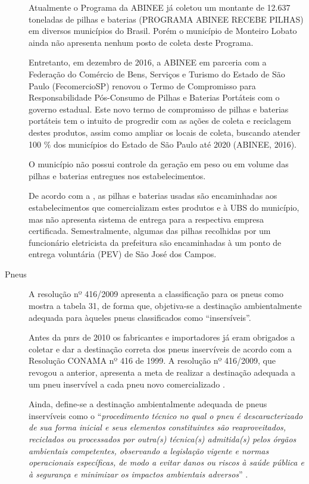 \begin{description}
		Atualmente o Programa da ABINEE já coletou um montante de 12.637 toneladas de pilhas e baterias (PROGRAMA ABINEE RECEBE PILHAS) em diversos municípios do Brasil. Porém o município de Monteiro Lobato ainda não apresenta nenhum posto de coleta deste Programa.
		
		Entretanto, em dezembro de 2016, a ABINEE em parceria com a Federação do Comércio de Bens, Serviços e Turismo do Estado de São Paulo (FecomercioSP) renovou o Termo de Compromisso para Responsabilidade Pós-Consumo de Pilhas e Baterias Portáteis com o governo estadual. Este novo termo de compromisso de pilhas e baterias portáteis tem o intuito de progredir com as ações de coleta e reciclagem destes produtos, assim como ampliar os locais de coleta, buscando atender 100 \% dos municípios do Estado de São Paulo até 2020 (ABINEE, 2016).
		
			O município não possui controle da geração em peso ou em volume das pilhas e baterias entregues nos estabelecimentos.
		
			De acordo com a , as pilhas e baterias usadas são encaminhadas aos estabelecimentos que comercializam estes produtos e à UBS do município, mas não apresenta sistema de entrega para a respectiva empresa certificada. Semestralmente, algumas das pilhas recolhidas por um funcionário eletricista da prefeitura são encaminhadas à um ponto de entrega voluntária (PEV) de São José dos Campos.
		
		
		\item[Pneus] A resolução nº 416/2009 apresenta a classificação para os pneus como mostra a tabela 31, de forma que, objetiva-se a destinação ambientalmente adequada para àqueles pneus classificados como “insersíveis”.	
	
		
	
		Antes da \gls{pnrs} de 2010 os fabricantes e importadores já eram obrigados a coletar e dar a destinação correta dos pneus inservíveis de acordo com a Resolução CONAMA nº 416 de 1999. A resolução nº 416/2009, que revogou a anterior, apresenta a meta de realizar a destinação adequada a um pneu inservível a cada pneu novo comercializado \cite{conama:416}.

		Ainda, define-se a destinação ambientalmente adequada de pneus inservíveis como o “\textit{procedimento técnico no qual o pneu é descaracterizado de sua forma inicial e seus elementos constituintes são reaproveitados, reciclados ou processados por outra(s) técnica(s) admitida(s) pelos órgãos ambientais competentes, observando a legislação vigente e normas operacionais específicas, de modo a evitar danos ou riscos à saúde pública e à segurança e minimizar os impactos ambientais adversos}” \cite{conama:416}. 
	

\end{description}
